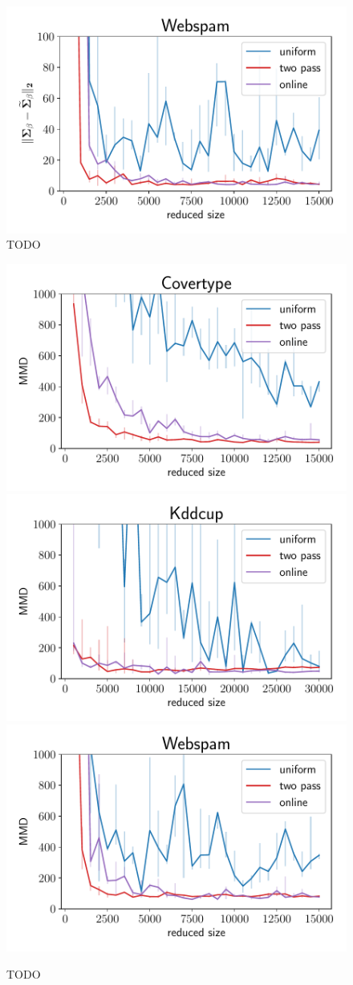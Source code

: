 \begin{figure}[t]
    \includegraphics[width=.49\linewidth]{figures/webspam_bayes_plot_matrix_norm.pdf}
    \caption{TODO}
    \label{fig:bayes-plots-norm-cov}
\end{figure}

\begin{figure}[t]
    \centering
    \includegraphics[width=.49\linewidth]{figures/covertype_bayes_plot_mmd.pdf}
    \includegraphics[width=.49\linewidth]{figures/kddcup_bayes_plot_mmd.pdf}
    \includegraphics[width=.49\linewidth]{figures/webspam_bayes_plot_mmd.pdf}
    \caption{TODO}
    \label{fig:bayes-plots-mmd}
\end{figure}
